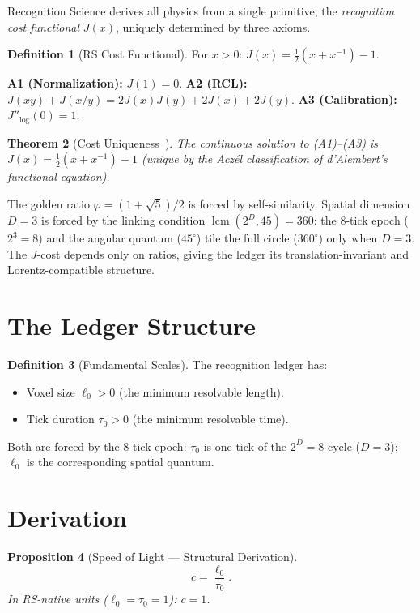 \documentclass[12pt,a4paper]{article}
\newtheorem{theorem}{Theorem}[section]
\newtheorem{proposition}[theorem]{Proposition}
\theoremstyle{definition}
\newtheorem{definition}[theorem]{Definition}
\theoremstyle{remark}
\begin{document}
Recognition Science derives all physics from a single primitive,
the \emph{recognition cost functional} $J(x)$, uniquely determined
by three axioms.

\begin{definition}[RS Cost Functional]
For $x > 0$:
$J(x) = \tfrac{1}{2}(x + x^{-1}) - 1$.
\end{definition}

\noindent\textbf{A1 (Normalization):} $J(1) = 0$.\quad
\textbf{A2 (RCL):} $J(xy) + J(x/y) = 2J(x)J(y) + 2J(x) + 2J(y)$.\quad
\textbf{A3 (Calibration):} $J''_{\log}(0) = 1$.

\begin{theorem}[Cost Uniqueness~\cite{Aczel1966}]
\label{thm:unique}
The continuous solution to \textup{(A1)--(A3)} is $J(x) =
\tfrac{1}{2}(x + x^{-1}) - 1$ (unique by the Acz\'el classification of
d'Alembert's functional equation).
\end{theorem}

\noindent The golden ratio $\varphi = (1+\sqrt{5})/2$ is forced by
self-similarity.  Spatial dimension $D = 3$ is forced by the linking
condition $\operatorname{lcm}(2^D,45) = 360$: the 8-tick
epoch ($2^3 = 8$) and the angular quantum ($45^\circ$) tile the
full circle ($360^\circ$) only when $D = 3$.
The $J$-cost depends only on ratios, giving the ledger its
translation-invariant and Lorentz-compatible structure.

\section{The Ledger Structure}

\begin{definition}[Fundamental Scales]
The recognition ledger has:
\begin{itemize}
  \item Voxel size $\ell_0 > 0$ (the minimum resolvable length).
  \item Tick duration $\tau_0 > 0$ (the minimum resolvable time).
\end{itemize}
Both are forced by the 8-tick epoch: $\tau_0$ is one tick of the
$2^D = 8$ cycle ($D = 3$); $\ell_0$ is the corresponding spatial
quantum.
\end{definition}

\section{Derivation}

\begin{proposition}[Speed of Light --- Structural Derivation]
\begin{equation}
  \boxed{c = \frac{\ell_0}{\tau_0}.}
\end{equation}
In RS-native units ($\ell_0 = \tau_0 = 1$): $c = 1$.
\end{proposition}
\end{document}
